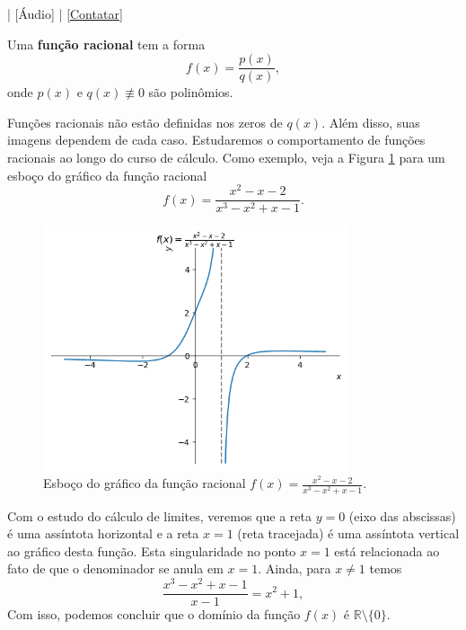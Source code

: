 \begin{flushright}
  [Vídeo] | [Áudio] | \href{https://phkonzen.github.io/notas/contato.html}{[Contatar]}
\end{flushright}

Uma {\bf função racional} tem a forma
\begin{equation}
  f(x) = \frac{p(x)}{q(x)},
\end{equation}
onde $p(x)$ e $q(x)\not\equiv 0$ são polinômios.

Funções racionais não estão definidas nos zeros de $q(x)$. Além disso, suas imagens dependem de cada caso. Estudaremos o comportamento de funções racionais ao longo do curso de cálculo. Como exemplo, veja a Figura \ref{fig:racional_grafico} para um esboço do gráfico da função racional
\begin{equation}
  f(x) = \frac{x^2-x-2}{x^3-x^2+x-1}.
\end{equation}

\begin{figure}[H]
  \centering
  \includegraphics[width=0.8\textwidth]{./cap_funcao/dados/fig_racional_grafico/fig_racional_grafico}
  \caption{Esboço do gráfico da função racional $f(x) = \frac{x^{2} - x - 2}{x^{3} - x^{2} + x - 1}$.}
  \label{fig:racional_grafico}
\end{figure}

Com o estudo do cálculo de limites, veremos que a reta $y = 0$ (eixo das abscissas) é uma assíntota horizontal e a reta $x=1$ (reta tracejada) é uma assíntota vertical ao gráfico desta função. Esta singularidade no ponto $x=1$ está relacionada ao fato de que o denominador se anula em $x=1$. Ainda, para $x\neq 1$ temos
\begin{equation}
  \frac{x^3 - x^2 + x - 1}{x-1} = x^2 + 1,
\end{equation}
Com isso, podemos concluir que o domínio da função $f(x)$ é $\mathbb{R}\setminus\{0\}$.


